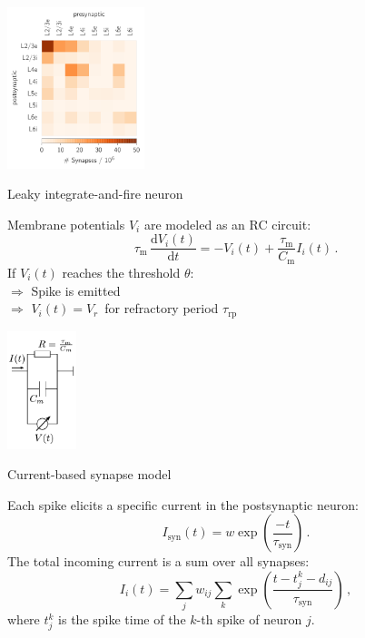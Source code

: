 \documentclass[portrait, final, a0paper, fontscale=0.34]{baposter}
\begin{document}
\begin{poster}
{\begin{multicols}{3}
        \includegraphics[height=4.7cm]{synapse_numbers} 
    \end{multicols} 

    \centerline{Leaky integrate-and-fire neuron}
    \vspace{0.2cm}
    \begin{vwcol}[widths={0.75, 0.3},
            sep=.4cm, rule=0pt, indent=0em] 
    Membrane potentials $V_i$ are modeled as an RC circuit:
        \begin{equation*}
            \tau_\text{m} \,\frac{\text{d} V_i(t)}{\text{d} t} 
                    = - V_i(t) + \frac{\tau_\text{m}}{C_\text{m}} I_i(t) \,.
        \end{equation*}
        If $V_i(t)$ reaches the threshold $\theta$: \\
        \vspace{0.2cm}
            \quad $\Rightarrow$ 
                Spike is emitted \\
        \vspace{0.2cm}
            \quad $\Rightarrow$ 
                $V_i(t) = V_r$ \,for refractory period $\tau_\text{rp}$ 

    \includegraphics[width=2cm]{RC_circuit}

    \end{vwcol} 

    \vspace{0.5cm}
    \centerline{Current-based synapse model}
    \vspace{0.3cm}
    Each spike elicits a specific current in the postsynaptic neuron:
    \begin{equation*}
    I_{\text{syn}}(t) = w \exp{\left(\frac{-t}{\tau_\text{syn}}\right)}	\,.
    \end{equation*}
    The total incoming current is a sum over all synapses:
    \begin{equation*}
        I_i(t) = 
            \sum_j w_{ij} \sum_k 
            \exp\left(\frac{t - t_j^k - d_{ij}}{\tau_\text{syn}}\right)  \, ,
    \end{equation*}
    where $t^k_j$ is the spike time of the $k$-th spike of neuron $j$.
}



\end{poster}
\end{document}
